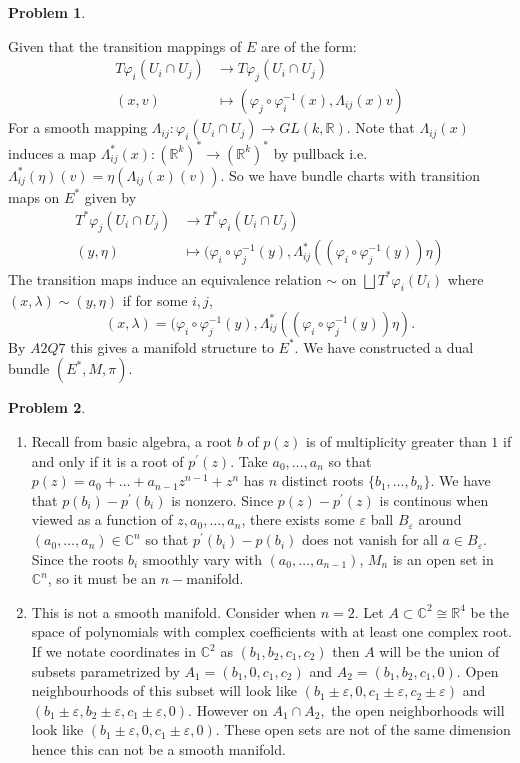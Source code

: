 \documentclass[12pt, a4paper]{article}
\newtheorem{problem}{Problem}
\theoremstyle{definition}
\newcommand{\penum}{ \begin{enumerate}[label=\bf(\alph*), leftmargin=0pt]}
\newcommand{\epenum}{ \end{enumerate} }
\newcommand{\R}{\mathbb{R}}                           %
\newcommand{\C}{\mathbb{C}}                           %
\newcommand{\ep}{\varepsilon}
\newcommand{\vph}{\varphi}
\begin{document}
\newpage
\begin{problem}
\end{problem}
Given that the transition mappings of $E$ are of the form: 
\begin{align*}
	T\vph_i(U_i \cap U_j) &\to T\vph_j(U_i \cap U_j)
		\\ (x,v) &\mapsto (\vph_j \circ \vph_i^{-1}(x) , \Lambda_{ij}(x) v) 
\end{align*} For a smooth mapping $\Lambda_{ij}: \vph_i(U_i \cap U_j) \to GL(k, \R)$. Note that $\Lambda_{ij}(x)$ induces a map $\Lambda_{ij}^\ast(x):(\R^k)^\ast \to (\R^k)^\ast$ by pullback i.e. $\Lambda_{ij}^\ast (\eta)(v) = \eta(\Lambda_{ij}(x)(v))$. So we have bundle charts with transition maps on $E^\ast$ given by 
\begin{align*}
	T^\ast\vph_j(U_i \cap U_j) &\to T^\ast \vph_i(U_i \cap U_j)
	\\ (y , \eta) & \mapsto (\vph_i \circ \vph_j^{-1}(y), \Lambda^\ast_{ij}((\vph_i \circ \vph_j^{-1}(y))\eta )
\end{align*}
The transition maps induce an equivalence relation $\sim$ on $\bigsqcup T^\ast\vph_i(U_i)$ where $(x,\lambda) \sim (y,\eta)$ if for some $i,j$, $$(x, \lambda ) =(\vph_i \circ \vph_j^{-1}(y), \Lambda^\ast_{ij}((\vph_i \circ \vph_j^{-1}(y))\eta ).$$
By $A2Q7$ this gives a manifold structure to $E^\ast$. We have constructed a dual bundle $(E^\ast , M, \pi).$ 
\newpage
\begin{problem}
\end{problem}
\penum
\item Recall from basic algebra, a root $b$ of $p(z)$ is of multiplicity greater than $1$ if and only if it is a root of $p^\prime(z)$. Take $a_0 , \dots , a_n$ so that $p(z) =a_0 + \dots + a_{n-1}z^{n-1} + z^n $ has $n$ distinct roots $\{b_1, \dots ,b_n\}$. We have that $p(b_i) - p^\prime(b_i)$ is nonzero. Since $p(z) - p^\prime(z)$ is continous when viewed as a function of $z,a_0, \dots , a_n$, there exists some $\ep$ ball $B_\ep$ around $(a_0, \dots , a_n)\in \C^n$ so that $p^\prime(b_i)-p(b_i)$ does not vanish for all $a\in B_\ep$. Since the roots $b_i$ smoothly vary with $(a_0 , \dots , a_{n-1})$, $M_n$ is an open set in $\C^n$, so it must be an $n-$manifold. 
\item This is not a smooth manifold. Consider when $n=2$. Let $A \subset \C^2 \cong \R^4$ be the space of polynomials with complex coefficients with at least one complex root. If we notate coordinates in $\C^2$ as $(b_1,b_2, c_1, c_2)$ then $A$ will be the union of subsets parametrized by $A_1 = (b_1,0,c_1,c_2)$ and $A_2 = (b_1,b_2,c_1,0)$. Open neighbourhoods of this subset will look like $(b_1 \pm \ep, 0 , c_1 \pm \ep, c_2 \pm \ep)$ and $(b_1 \pm \ep , b_2 \pm \ep, c_1 \pm \ep , 0)$. However on $A_1 \cap A_2,$ the open neighborhoods will look like $(b_1 \pm \ep , 0 , c_1 \pm \ep , 0)$. These open sets are not of the same dimension hence this can not be a smooth manifold. 
\epenum
\end{document}
